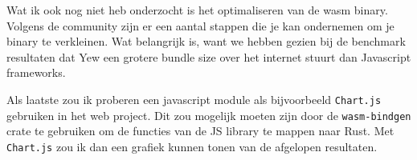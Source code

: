 Wat ik ook nog niet heb onderzocht is het optimaliseren van de wasm binary. Volgens de community
zijn er een aantal stappen die je kan ondernemen om je binary te verkleinen. Wat belangrijk is, want
we hebben gezien bij de benchmark resultaten dat Yew een grotere bundle size over het internet
stuurt dan Javascript frameworks.

Als laatste zou ik proberen een javascript module als bijvoorbeeld \texttt{Chart.js}
gebruiken in het web project. Dit zou mogelijk moeten zijn door de \texttt{wasm-bindgen}
crate te gebruiken om de functies van de JS library te mappen naar Rust. Met
\texttt{Chart.js} zou ik dan een grafiek kunnen tonen van de afgelopen resultaten.
